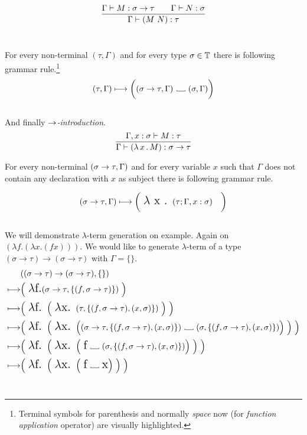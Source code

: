 \documentclass[12pt,a4paper]{report}
\newcommand{\lterm}{$\lambda$-term\xspace}
\newcommand{\tur}[3]{#1\vdash{}#2:#3}
\newcommand\Vtextvisiblespace[1][.3em]{%
  \mbox{\kern.06em\vrule height.3ex}%
  \vbox{\hrule width#1}%
  \hbox{\vrule height.3ex}}
\begin{document}
$$
\ruleII{ \tur{\Gamma}{M}{\sigma \ar \tau} }
       { \tur{\Gamma}{N}{\sigma} }
       { \tur{\Gamma}{(M~N)}{\tau} }
$$~

For every non-terminal $(\tau,\Gamma)$ 
and for every type $\sigma \in \mathbb{T}$ 
there is following grammar rule.\footnote{ 
Terminal symbols for parenthesis and normally {\it space} 
now \textvisiblespace \quad (for {\it function application} operator) 
are visually highlighted. } 
$$
	( \tau , \Gamma )  \gar
	\bigg( ( \sigma \rightarrow \tau , \Gamma ) 
	\mbox{ \Vtextvisiblespace[1em] } ( \sigma , \Gamma ) \bigg)
$$\\

And finally {\it $\rightarrow$-introduction}. 
$$
\ruleI { \tur{\Gamma,x:\sigma}{M}{\tau} }
       { \tur{\Gamma}{\lamb{x}{M}}{\sigma \ar \tau} }
$$

For every non-terminal $(\sigma \rightarrow \tau,\Gamma)$
and for every variable $x$ such that $\Gamma$ does not contain any 
declaration with $x$ as subject
there is following grammar rule.
 


$$ 
	( \sigma \rightarrow \tau , \Gamma )  \longmapsto
	\bigg( \mbox{ {\Large $\lambda$ x . }}( \tau ; \Gamma ,x:\sigma ) \quad \bigg)
$$\\

We will demonstrate \lterm generation on example. 
Again on $(\lambda f . (\lambda x . (f x) ))$. 
We would like to generate \lterm of a type 
$(\sigma \rightarrow \tau) \rightarrow (\sigma \rightarrow \tau)$
with $\Gamma = \{\}$.
\begin{align*}
	& ((\sigma \rightarrow \tau) \rightarrow (\sigma \rightarrow \tau),\{\}) \\ 
	\gar & \Big( \mbox{ {\Large $\lambda$f.}}
	  ( \sigma \rightarrow \tau , \{ (f,\sigma \rightarrow \tau) \} ) 
	~ \Big)
	\\
	\gar & 
	\Big( \mbox{ {\Large $\lambda$f. }}
		\Big( \mbox{ {\Large $\lambda$x. }}
	  	 	( \tau , \{ (f,\sigma \rightarrow \tau) , (x,\sigma) \} ) 
		~ \Big)  	 
	~ \Big)
	\\
	\gar & 
	\Big( \mbox{ {\Large $\lambda$f. }}
		\Big( \mbox{ {\Large $\lambda$x. }}	  	 	
	  	 	\Big( 
	  	 	  ( \sigma \rightarrow \tau , \{ (f,\sigma \rightarrow \tau) , (x,\sigma) \} ) 
			  \mbox{ \Vtextvisiblespace[1em] } 
			  ( \sigma , \{ (f,\sigma \rightarrow \tau) , (x,\sigma) \} )  \Big) 
		~ \Big)  	 
	 ~ \Big)
	\\
	\gar & 
	\Big( \mbox{ {\Large $\lambda$f. }}
		\Big( \mbox{ {\Large $\lambda$x. }}	  	 	
	  	 	\Big( 
	  	 	  \mbox{ {\Large f}} 
			  \mbox{ \Vtextvisiblespace[1em] } 
			  ( \sigma , \{ (f,\sigma \rightarrow \tau) , (x,\sigma) \} ) \Big) 
		~ \Big)  	 
	~ \Big)		
	\\
	\gar & 
	\Big( \mbox{ {\Large $\lambda$f. }}
		\Big( \mbox{ {\Large $\lambda$x. }}	  	 	
	  	 	\Big( 
	  	 	  \mbox{ {\Large f}} 
			  \mbox{ \Vtextvisiblespace[1em] } 
			  \mbox{{\Large x}} \Big) 
		~ \Big)  	 
	~ \Big)
\end{align*}~\\
\end{document}

